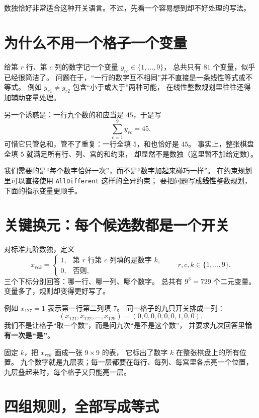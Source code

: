 \documentclass[UTF8,11pt,fontset=none]{ctexart}
\begin{document}
数独恰好非常适合这种开关语言。不过，先看一个容易想到却不好处理的写法。

\section{为什么不用一个格子一个变量}
给第 $r$ 行、第 $c$ 列的数字记一个变量 $y_{rc}\in\{1,\dots,9\}$，
总共只有 $81$ 个变量，似乎已经很简洁了。
问题在于，“一行的数字互不相同”并不直接是一条线性等式或不等式。
例如 $y_{r1}\ne y_{r2}$ 包含“小于或大于”两种可能，
在线性整数规划里往往还得加辅助变量处理。

另一个诱惑是：一行九个数的和应当是 $45$，于是写
\[
\sum_{c=1}^9 y_{rc}=45.
\]
可惜它只管总和，管不了重复：一行全填 $5$，和也恰好是 $45$。
事实上，整张棋盘全填 $5$ 就满足所有行、列、宫的和约束，
却显然不是数独（这里暂不加给定数）。

\begin{warnbox}
我们需要的是“每个数字恰好一次”，而不是“数字加起来碰巧一样”。
在约束规划里可以直接使用 \texttt{AllDifferent} 这样的全异约束；
要把问题写成\textbf{线性}整数规划，下面的指示变量更顺手。
\end{warnbox}

\section{关键换元：每个候选数都是一个开关}
对标准九阶数独，定义
\[
x_{rck}=\begin{cases}
1,&\text{第 $r$ 行第 $c$ 列填的是数字 $k$},\\
0,&\text{否则},
\end{cases}
\qquad r,c,k\in\{1,\dots,9\}.
\]
三个下标分别回答：哪一行、哪一列、哪个数字。
总共有 $9^3=729$ 个二元变量。变量多了，规则却变得更好写了。

例如 $x_{127}=1$ 表示第一行第二列填 $7$。
同一格子的九只开关排成一列：
\[
(x_{121},x_{122},\dots,x_{129})=(0,0,0,0,0,0,1,0,0).
\]
我们不是让格子“取一个数”，而是问九次“是不是这个数”，
并要求九次回答里\textbf{恰有一次是“是”}。

\begin{keybox}[从二维棋盘到三维开关]
固定 $k$，把 $x_{rck}$ 画成一张 $9\times9$ 的表，
它标出了数字 $k$ 在整张棋盘上的所有位置。
九个数字就是九层表；每一层都要在每行、每列、每宫里各点亮一个位置，
九层叠起来时，每个格子又只能亮一层。
\end{keybox}

\section{四组规则，全部写成等式}
\end{document}
